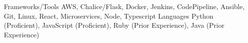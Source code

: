 
\begin{cvskills}
  \cvskill
    {Frameworks/Tools} %
    {AWS, Chalice/Flask, Docker, Jenkins, CodePipeline, Ansible, Git, Linux, React, Microservices, Node, Typescript} %
  \cvskill
    {Languages} %
    {Python (Proficient), JavaScript (Proficient), Ruby (Prior Experience), Java (Prior Experience)} %
\end{cvskills}
